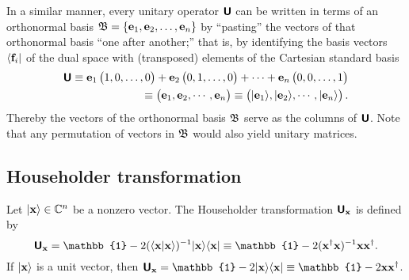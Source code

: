 In a similar manner, every unitary operator  $\textsf{\textbf{U}}$  can be written in terms of an orthonormal basis
${\frak B}=\{{\bf e}_1,  {\bf e}_2, \ldots , {\bf e}_n\}$
by ``pasting'' the  vectors of that orthonormal basis ``one after another;''
that is,  by identifying the basis vectors $\langle {\bf f}_i \vert $ of the dual space
with (transposed) elements of the Cartesian standard basis
\begin{equation}
\begin{split}
\textsf{\textbf{U}}
\equiv
{\bf e}_1 \begin{pmatrix} 1,0,\ldots ,0\end{pmatrix} +
{\bf e}_2 \begin{pmatrix} 0,1,\ldots ,0\end{pmatrix} +
\cdots +
{\bf e}_n \begin{pmatrix} 0,0,\ldots ,1\end{pmatrix}   \\
\equiv
\begin{pmatrix}
{\bf e}_1,
{\bf e}_2,
\cdots,
{\bf e}_n
\end{pmatrix}
\equiv
\begin{pmatrix}
\vert {\bf e}_1 \rangle ,
\vert {\bf e}_2 \rangle ,
\cdots,
\vert {\bf e}_n \rangle
\end{pmatrix}
.
\end{split}
\label{2015-m-ch-fdlvs-uniascolv}
\end{equation}
Thereby the vectors of the orthonormal basis  ${\frak B}$ serve as the
columns of $\textsf{\textbf{U}}$.
Note that any permutation of vectors in ${\frak B}$ would also yield unitary matrices.

\subsection{Householder transformation}
\label{2021-m-ch-hposholder}

Let $\vert {\bf x} \rangle \in \mathbb{C}^n$ be a nonzero vector. The
Householder transformation\cite{Horn-Johnson-MatrixAnalysis} $\textsf{\textbf{U}}_{\bf x}$ is defined by
\begin{equation}
\textsf{\textbf{U}}_{\bf x}
=
\mathbb{1}- 2 ( \langle {\bf x} \vert   {\bf x} \rangle )^{-1} \vert {\bf x} \rangle \langle  {\bf x}  \vert
\equiv
\mathbb{1}- 2 ( {\bf x}^\dagger   {\bf x} )^{-1}  {\bf x}    {\bf x}^\dagger .
\end{equation}
 If  $\vert {\bf x} \rangle $ is a unit vector, then
$\textsf{\textbf{U}}_{\bf x}
=
\mathbb{1}- 2  \vert {\bf x} \rangle \langle  {\bf x}  \vert
\equiv
\mathbb{1}- 2   {\bf x}    {\bf x}^\dagger $.

